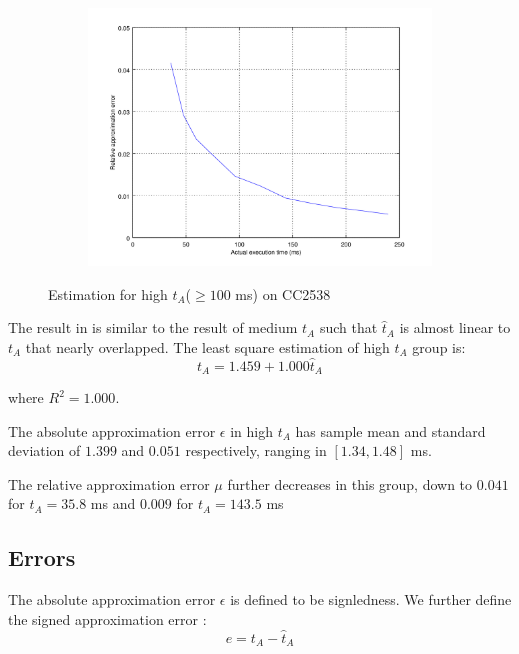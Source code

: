 \begin{figure}[ht!]
\begin{subfigure}{0.45\linewidth}
	\includegraphics[width=\linewidth]{fig/highrtvtaerr.png}
	\end{subfigure}
	\caption{Estimation for high $t_A$($\geq 100$ ms) on CC2538}
	\label{Fig: Estimation for high tA}
\end{figure}

The result in  is similar to the result of medium $t_A$ such that $\hat{t}_A$ is almost linear to $t_A$ that nearly overlapped. The least square estimation of high $t_A$ group is:
\begin{equation}
	t_A = 1.459 + 1.000\hat{t}_A
\end{equation}

where $R^2 = 1.000$. 

The absolute approximation error $\epsilon$ in high $t_A$ has sample mean and standard deviation of $1.399$ and $0.051$ respectively, ranging in $[1.34, 1.48]$ ms.

The relative approximation error $\mu$ further decreases in this group, down to $0.041$  for $t_A = 35.8$ ms and $0.009$ for $t_A = 143.5$ ms


\subsection{Errors}

The absolute approximation error $\epsilon$ is defined to be signledness. We further define the signed approximation error :
\begin{equation} \label{Eq: e}
e = t_A - \hat{t}_A
\end{equation}

